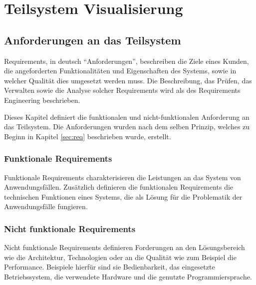 
\chapter{Teilsystem Visualisierung}
\label{sec:TeilVisu}
\section{Anforderungen an das Teilsystem}
Requirements, in deutsch \enquote{Anforderungen}, beschreiben die Ziele eines Kunden, die angeforderten Funktionalit\"aten und Eigenschaften des Systems, sowie in welcher Qualit\"at dies umgesetzt werden muss\cite{Heini2010}. Die Beschreibung, das Pr\"ufen, das Verwalten sowie die Analyse solcher Requirements wird als des Requirements Engineering beschrieben\cite{Sophist2011}. \par\smallskip 
Dieses Kapitel definiert die funktionalen und nicht-funktionalen Anforderung an das Teilsystem. Die Anforderungen wurden nach dem selben Prinzip, welches zu Beginn in Kapitel \ref{sec:req} beschrieben wurde, erstellt.

\subsection*{Funktionale Requirements}
Funktionale Requirements charakterisieren die Leistungen an das System von Anwendungsf\"allen. Zus\"atzlich definieren die funktionalen Requirements die technischen Funktionen eines Systems, die als L\"osung f\"ur die Problematik der Anwendungsf\"alle fungieren\cite{Goll2011}.


\subsection*{Nicht funktionale Requirements}
Nicht funktionale Requirements definieren Forderungen an den L\"osungsbereich wie die Architektur, Technologien oder an die Qualit\"at wie zum Beispiel die Performance. Beispiele hierf\"ur sind sie Bedienbarkeit, das eingesetzte Betriebssystem, die verwendete Hardware und die genutzte Programmiersprache\cite{Goll2011}.


